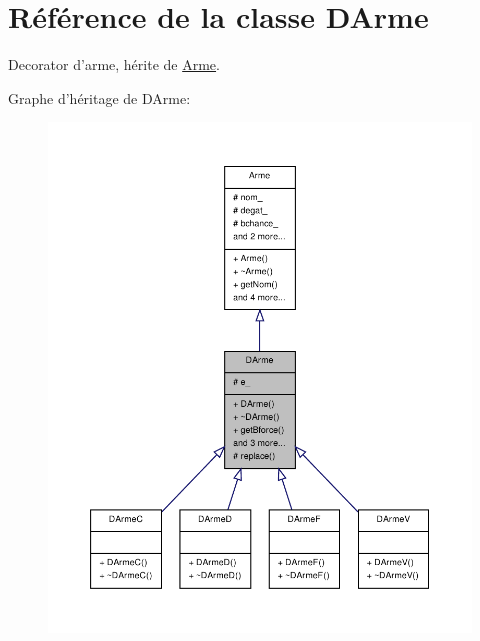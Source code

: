 \hypertarget{class_d_arme}{\section{Référence de la classe D\-Arme}
\label{class_d_arme}
}


Decorator d'arme, hérite de \hyperlink{class_arme}{Arme}.  




Graphe d'héritage de D\-Arme\-:
\nopagebreak
\begin{figure}[H]
\begin{center}
\leavevmode
\includegraphics[width=350pt]{class_d_arme__inherit__graph}
\end{center}
\end{figure}


